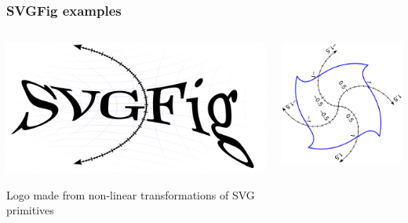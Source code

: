 \documentclass[compress]{beamer}
\begin{document}
\begin{frame}
\frametitle{SVGFig examples}

\vspace{-0.4 cm}
\begin{columns}
\begin{center}
\includegraphics[width=\linewidth]{svgfig_logo.png}

Logo made from non-linear transformations of SVG primitives
\end{center}

\begin{center}
\includegraphics[width=\linewidth]{introduction-10.png}


\end{center}
\end{columns}
\end{frame}
\end{document}
